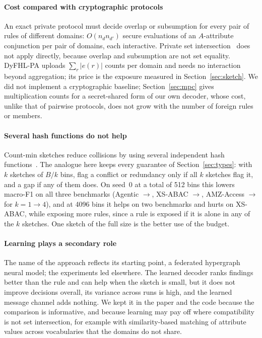 \documentclass[preprint,12pt]{elsarticle}
\theoremstyle{definition}
\newcommand{\name}{DyFHL-PA\xspace}
\begin{document}
\paragraph{Cost compared with cryptographic protocols} An exact private protocol must decide overlap or subsumption for every pair of rules of different domains: $O(n_dn_{d'})$ secure evaluations of an $A$-attribute conjunction per pair of domains, each interactive. Private set intersection~\cite{freedman2004efficient} does not apply directly, because overlap and subsumption are not set equality. \name uploads $\sum_r|e(r)|$ counts per domain and needs no interaction beyond aggregation; its price is the exposure measured in Section~\ref{sec:sketch}. We did not implement a cryptographic baseline; Section~\ref{sec:mpc} gives multiplication counts for a secret-shared form of our own decoder, whose cost, unlike that of pairwise protocols, does not grow with the number of foreign rules or members.

\paragraph{Several hash functions do not help} Count-min sketches reduce collisions by using several independent hash functions~\cite{cormode2005countmin}. The analogue here keeps every guarantee of Section~\ref{sec:types}: with $k$ sketches of $B/k$ bins, flag a conflict or redundancy only if all $k$ sketches flag it, and a gap if any of them does. On seed~0 at a total of 512 bins this lowers macro-F1 on all three benchmarks (Agentic \mhagenticBdxiikb{}$\to$\mhagenticBdxiike, XS-ABAC \mhxustollerBdxiikb{}$\to$\mhxustollerBdxiike, AMZ-Access \mhamazonBdxiikb{}$\to$\mhamazonBdxiike{} for $k=1\to4$), and at 4096 bins it helps on two benchmarks and hurts on XS-ABAC, while exposing more rules, since a rule is exposed if it is alone in any of the $k$ sketches. One sketch of the full size is the better use of the budget.

\paragraph{Learning plays a secondary role} The name of the approach reflects its starting point, a federated hypergraph neural model; the experiments led elsewhere. The learned decoder ranks findings better than the rule and can help when the sketch is small, but it does not improve decisions overall, its variance across runs is high, and the learned message channel adds nothing. We kept it in the paper and the code because the comparison is informative, and because learning may pay off where compatibility is not set intersection, for example with similarity-based matching of attribute values across vocabularies that the domains do not share.
\end{document}
